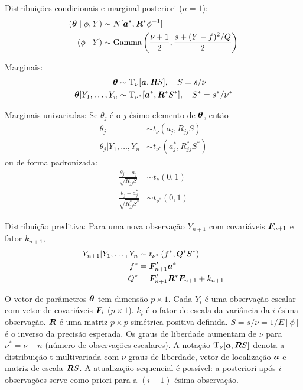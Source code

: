\begin{theorem}
\begin{outline}
		\3 Distribuições condicionais e marginal posteriori ($n=1$):
		\begin{align}
			(\bm{\theta} \mid \phi, Y) &\sim N[\bm{a}^*, \bm{R}^*\phi^{-1}] \\
			(\phi \mid Y) &\sim \text{Gamma}\left(\frac{\nu+1}{2}, \frac{s + (Y-f)^2/Q}{2}\right)
		\end{align}
		
		\1 Marginais:
		\begin{align}
			\bm{\theta} &\sim \text{T}_\nu[\bm{a}, \bm{R}S], \quad S = s/\nu \\
			\bm{\theta}|Y_1, \ldots, Y_n &\sim \text{T}_{\nu^*}[\bm{a}^*, \bm{R}^*S^*], \quad S^* = s^*/\nu^*
		\end{align}
		
		\1 Marginais univariadas: Se $\theta_j$ é o $j$-ésimo elemento de $\bm{\theta}$, então
		\begin{align}
			\theta_j &\sim t_\nu\left(a_j, R_{jj}S\right) \\
			\theta_j|Y_1, \ldots, Y_n &\sim t_{\nu^*}\left(a_j^*, R_{jj}^*S^*\right)
		\end{align}
		ou de forma padronizada:
		\begin{align}
			\frac{\theta_j - a_j}{\sqrt{R_{jj}S}} &\sim t_\nu(0, 1) \\
			\frac{\theta_j - a_j^*}{\sqrt{R_{jj}^*S^*}} &\sim t_{\nu^*}(0, 1)
		\end{align}
		
		\1 Distribuição preditiva: Para uma nova observação $Y_{n+1}$ com covariáveis $\bm{F}_{n+1}$ e fator $k_{n+1}$,
		\begin{align}
			Y_{n+1}|Y_1, \ldots, Y_n &\sim t_{\nu^*}\left(f^*, Q^*S^*\right) \\
			f^* &= \bm{F}_{n+1}'\bm{a}^* \\
			Q^* &= \bm{F}_{n+1}'\bm{R}^*\bm{F}_{n+1} + k_{n+1}
		\end{align}
	\end{outline}
	
	\begin{note}
		\leavevmode
		\begin{outline}
			\1 O vetor de parâmetros $\bm{\theta}$ tem dimensão $p \times 1$.
			\1 Cada $Y_i$ é uma observação escalar com vetor de covariáveis $\bm{F}_i$ ($p \times 1$).
			\1 $k_i$ é o fator de escala da variância da $i$-ésima observação.
			\1 $\bm{R}$ é uma matriz $p \times p$ simétrica positiva definida.
			\1 $S = s/\nu = 1/E[\phi]$ é o inverso da precisão esperada.
			\1 Os graus de liberdade aumentam de $\nu$ para $\nu^* = \nu + n$ (número de observações escalares).
			\1 A notação $\text{T}_\nu[\bm{a}, \bm{R}S]$ denota a distribuição t multivariada com $\nu$ graus de liberdade, vetor de localização $\bm{a}$ e matriz de escala $\bm{R}S$.
			\1 A atualização sequencial é possível: a posteriori após $i$ observações serve como priori para a $(i+1)$-ésima observação.
		\end{outline}
	\end{note}
\end{theorem}